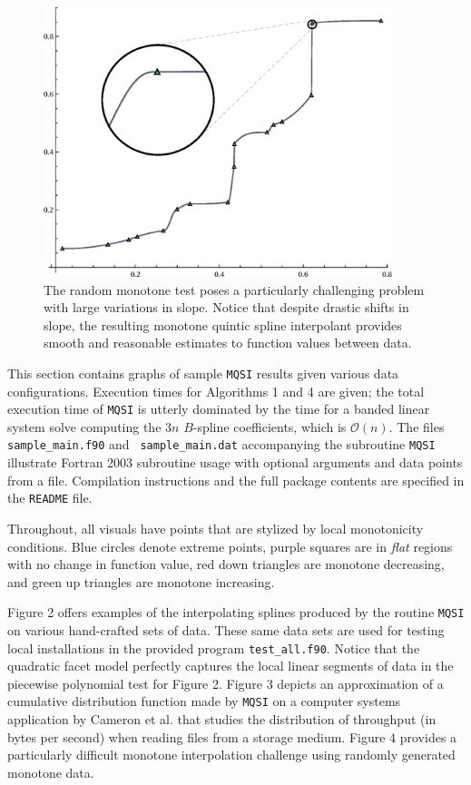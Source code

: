 \begin{figure}[h]
  \centering
  \includegraphics[width=4in]{vis/6-random-monotone.eps}
\caption{ %
The {\itVIII random monotone} test poses a particularly challenging
problem with large variations in slope. Notice that despite drastic
shifts in slope, the resulting monotone quintic spline interpolant
provides smooth and reasonable estimates to function values between data.}
\end{figure}

This section contains graphs of sample {\tt MQSI} results given various
data configurations. Execution times for Algorithms 1 and 4 are given; the
total execution time of {\tt MQSI} is utterly dominated by the time for a
banded linear system solve computing the $3n$ $B$-spline coefficients,
which is $\mathcal{O}(n)$.  The files {\tt sample\_main.f90} and {\tt
sample\_main.dat} accompanying the subroutine {\tt MQSI} illustrate Fortran
2003 subroutine usage with optional arguments and data points from a file.
Compilation instructions and the full package contents are specified in
the {\tt README} file.

Throughout, all visuals have points that are stylized by local
monotonicity conditions. Blue circles denote extreme points, purple
squares are in {\it flat} regions with no change in function value,
red down triangles are monotone decreasing, and green up triangles are
monotone increasing.

Figure 2 offers examples of the interpolating splines produced by the
routine {\tt MQSI} on various hand-crafted sets of data. These same
data sets are used for testing local installations in the provided
program {\tt test\_all.f90}. Notice that the quadratic facet model
perfectly captures the local linear segments of data in the piecewise
polynomial test for Figure 2. Figure 3 depicts an approximation of a
cumulative distribution function made by {\tt MQSI} on a computer
systems application by Cameron et al. \cite{cameron2019moana} that studies the
distribution of throughput (in bytes per second) when reading files
from a storage medium. Figure 4 provides a particularly difficult
monotone interpolation challenge using randomly generated monotone
data.

